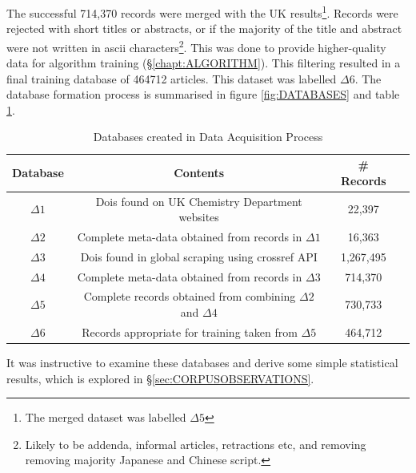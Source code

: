 The successful 714,370 records were merged with the UK results\footnote{The merged dataset was labelled $\Delta5$}. Records were rejected with short titles or abstracts, or if the majority of the title and abstract were not written in ascii characters\footnote{Likely to be addenda, informal articles, retractions etc, and removing removing majority Japanese and Chinese script.}. This was done to provide higher-quality data for algorithm training (\S\ref{chapt:ALGORITHM}). This filtering resulted in a final training database of 464712 articles. This dataset was labelled $\Delta6$. The database formation process is summarised in figure \ref{fig:DATABASES} and table \ref{tab:DATABASES}.

\begin{table}[H]
\caption{Databases created in Data Acquisition Process}
\label{tab:DATABASES}
\begin{tabular}{||c|c|c|c||}
\hline 
Database &  Contents & \# Records\\
\hline
$\Delta1$ & Dois found on UK Chemistry Department websites & 22,397 \\
$\Delta2$ & Complete meta-data obtained from records in $\Delta1$ & 16,363 \\
$\Delta3$ & Dois found in global scraping using crossref API & 1,267,495  \\
$\Delta4$ & Complete meta-data obtained from records in $\Delta3$ & 714,370 \\
$\Delta5$ & Complete records obtained from combining $\Delta2$ and $\Delta4$ & 730,733 \\
$\Delta6$ & Records appropriate for training taken from $\Delta5$ & 464,712 \\
\hline
\end{tabular}
\end{table}

It was instructive to examine these databases and derive some simple statistical results, which is explored in \S\ref{sec:CORPUSOBSERVATIONS}.